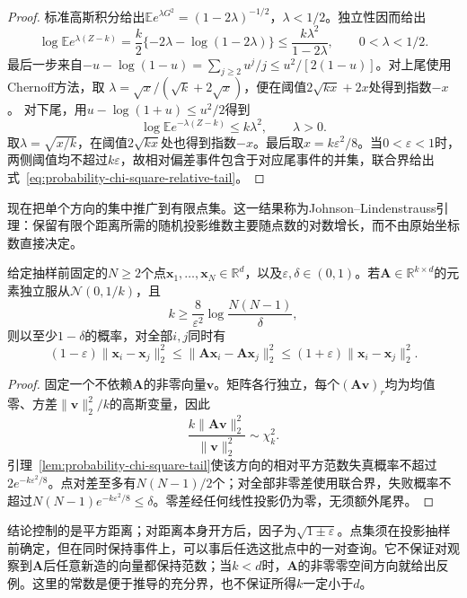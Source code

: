 \begin{proof}
标准高斯积分给出\(\mathbb E e^{\lambda G^2}=(1-2\lambda)^{-1/2}\)，\(\lambda<1/2\)。独立性因而给出
\[
  \log\mathbb E e^{\lambda(Z-k)}
  =\frac{k}{2}\{-2\lambda-\log(1-2\lambda)\}
  \leq\frac{k\lambda^2}{1-2\lambda},\qquad 0<\lambda<1/2.
\]
最后一步来自\(-u-\log(1-u)=\sum_{j\geq2}u^j/j\leq u^2/[2(1-u)]\)。对上尾使用Chernoff方法，取
\(\lambda=\sqrt{x}/(\sqrt{k}+2\sqrt{x})\)，便在阈值\(2\sqrt{kx}+2x\)处得到指数\(-x\)。
对下尾，用\(u-\log(1+u)\leq u^2/2\)得到
\[
  \log\mathbb E e^{-\lambda(Z-k)}\leq k\lambda^2,\qquad\lambda>0.
\]
取\(\lambda=\sqrt{x/k}\)，在阈值\(2\sqrt{kx}\)处也得到指数\(-x\)。最后取\(x=k\varepsilon^2/8\)。当\(0<\varepsilon<1\)时，两侧阈值均不超过\(k\varepsilon\)，故相对偏差事件包含于对应尾事件的并集，联合界给出式~\eqref{eq:probability-chi-square-relative-tail}。
\end{proof}

现在把单个方向的集中推广到有限点集。这一结果称为Johnson--Lindenstrauss引理：保留有限个距离所需的随机投影维数主要随点数的对数增长，而不由原始坐标数直接决定。
\begin{theorem}[高斯随机投影的距离保持]
  \label{thm:probability-johnson-lindenstrauss}
  给定抽样前固定的\(N\geq2\)个点\(\bm x_1,\ldots,\bm x_N\in\mathbb R^d\)，以及\(\varepsilon,\delta\in(0,1)\)。若\(\bm A\in\mathbb R^{k\times d}\)的元素独立服从\(\mathcal N(0,1/k)\)，且
  \[
    k\geq\frac8{\varepsilon^2}\log\frac{N(N-1)}\delta,
  \]
  则以至少\(1-\delta\)的概率，对全部\(i,j\)同时有
  \begin{equation}
    (1-\varepsilon)\|\bm x_i-\bm x_j\|_2^2
    \leq\|\bm A\bm x_i-\bm A\bm x_j\|_2^2
    \leq(1+\varepsilon)\|\bm x_i-\bm x_j\|_2^2.
    \label{eq:probability-jl-distance-preservation}
  \end{equation}
\end{theorem}
\begin{proof}
固定一个不依赖\(\bm A\)的非零向量\(\bm v\)。矩阵各行独立，每个\((\bm A\bm v)_r\)均为均值零、方差\(\|\bm v\|_2^2/k\)的高斯变量，因此
\[
  \frac{k\|\bm A\bm v\|_2^2}{\|\bm v\|_2^2}\sim\chi_k^2.
\]
引理~\ref{lem:probability-chi-square-tail}使该方向的相对平方范数失真概率不超过\(2e^{-k\varepsilon^2/8}\)。点对差至多有\(N(N-1)/2\)个；对全部非零差使用联合界，失败概率不超过\(N(N-1)e^{-k\varepsilon^2/8}\leq\delta\)。零差经任何线性投影仍为零，无须额外尾界。
\end{proof}
结论控制的是平方距离；对距离本身开方后，因子为\(\sqrt{1\pm\varepsilon}\)。点集须在投影抽样前确定，但在同时保持事件上，可以事后任选这批点中的一对查询。它不保证对观察到\(\bm A\)后任意新造的向量都保持范数；当\(k<d\)时，\(\bm A\)的非零零空间方向就给出反例。这里的常数是便于推导的充分界，也不保证所得\(k\)一定小于\(d\)。

